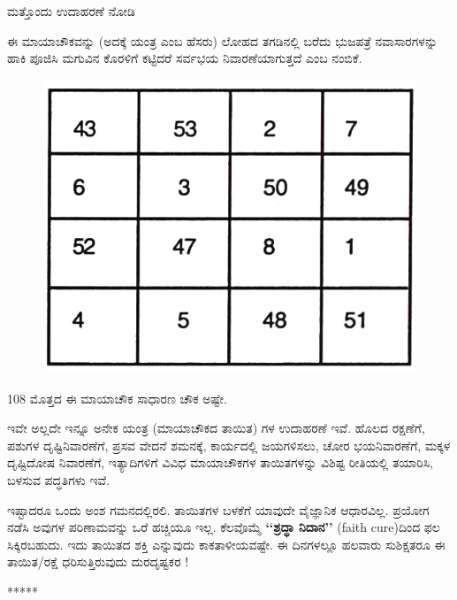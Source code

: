 ಮತ್ತೊಂದು ಉದಾಹರಣೆ ನೋಡಿ

ಈ ಮಾಯಾಚೌಕವನ್ನು (ಅದಕ್ಕೆ ಯಂತ್ರ ಎಂಬ ಹೆಸರು) ಲೋಹದ ತಗಡಿನಲ್ಲಿ ಬರೆದು ಭುಜಪತ್ರೆ ನವಾಸಾರಗಳನ್ನು ಹಾಕಿ ಪೂಜಿಸಿ ಮಗುವಿನ ಕೊರಳಿಗೆ ಕಟ್ಟಿದರೆ ಸರ್ವಭಯ ನಿವಾರಣೆಯಾಗುತ್ತದೆ ಎಂಬ ನಂಬಿಕೆ.
\begin{figure}[H]
\includegraphics{src/figures/chap11/fig11.4.jpg}
\end{figure}

108 ಮೊತ್ತದ ಈ ಮಾಯಾಚೌಕ ಸಾಧಾರಣ ಚೌಕ ಅಷ್ಟೇ.

ಇವೇ ಅಲ್ಲದೇ ಇನ್ನೂ ಅನೇಕ ಯಂತ್ರ (ಮಾಯಾಚೌಕದ ತಾಯಿತ) ಗಳ ಉದಾಹರಣೆ ಇವೆ. ಹೊಲದ ರಕ್ಷಣೆಗೆ, ಪಶುಗಳ ದೃಷ್ಟಿನಿವಾರಣೆಗೆ, ಪ್ರಸವ ವೇದನೆ ಶಮನಕ್ಕೆ, ಕಾರ್ಯದಲ್ಲಿ  ಜಯಗಳಿಸಲು, ಚೋರ ಭಯನಿವಾರಣೆಗೆ, ಮಕ್ಕಳ ದೃಷ್ಟಿದೋಷ ನಿವಾರಣೆಗೆ, ಇತ್ಯಾದಿಗಳಿಗೆ ವಿವಿಧ ಮಾಯಾಚೌಕಗಳ ತಾಯಿತಗಳನ್ನು ವಿಶಿಷ್ಟ ರೀತಿಯಲ್ಲಿ ತಯಾರಿಸಿ, ಬಳಸುವ ಪದ್ಧತಿಗಳು ಇವೆ.

ಇಷ್ಟಾದರೂ ಒಂದು ಅಂಶ ಗಮನದಲ್ಲಿರಲಿ. ತಾಯಿತಗಳ ಬಳಕೆಗೆ ಯಾವುದೇ ವೈಜ್ಞಾನಿಕ ಆಧಾರವಿಲ್ಲ. ಪ್ರಯೋಗ ನಡೆಸಿ ಅವುಗಳ ಪರಿಣಾಮವನ್ನು ಒರೆ ಹಚ್ಚಿಯೂ ಇಲ್ಲ. ಕೆಲವೊಮ್ಮೆ \textbf{‘‘ಶ್ರದ್ಧಾ ನಿದಾನ’’} (faith cure)ದಿಂದ ಫಲ ಸಿಕ್ಕಿರಬಹುದು. ಇದು ತಾಯಿತದ ಶಕ್ತಿ ಎನ್ನುವುದು ಕಾಕತಾಳೀಯವಷ್ಟೇ. ಈ ದಿನಗಳಲ್ಲೂ ಹಲವಾರು ಸುಶಿಕ್ಷತರೂ ಈ ತಾಯಿತ/ರಕ್ಷೆ ಧರಿಸುತ್ತಿರುವುದು ದುರದೃಷ್ಟಕರ !
\begin{center}
*****
\end{center}

